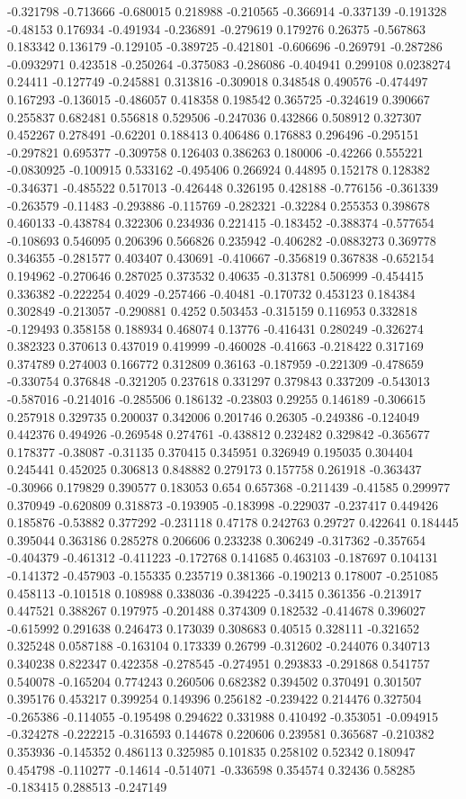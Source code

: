 -0.321798 -0.713666 -0.680015 0.218988 -0.210565 -0.366914 -0.337139 -0.191328 -0.48153 0.176934 -0.491934 -0.236891 -0.279619 0.179276 0.26375 -0.567863 0.183342 0.136179 -0.129105 -0.389725 -0.421801 -0.606696 -0.269791 -0.287286 -0.0932971 0.423518 -0.250264 -0.375083 -0.286086 -0.404941 0.299108 0.0238274 0.24411 -0.127749 -0.245881 0.313816 -0.309018 0.348548 0.490576 -0.474497 0.167293 -0.136015 -0.486057 0.418358 0.198542 0.365725 -0.324619 0.390667 0.255837 0.682481 0.556818 0.529506 -0.247036 0.432866 0.508912 0.327307 0.452267 0.278491 -0.62201 0.188413 0.406486 0.176883 0.296496 -0.295151 -0.297821 0.695377 -0.309758 0.126403 0.386263 0.180006 -0.42266 0.555221 -0.0830925 -0.100915 0.533162 -0.495406 0.266924 0.44895 0.152178 0.128382 -0.346371 -0.485522 0.517013 -0.426448 0.326195 0.428188 -0.776156 -0.361339 -0.263579 -0.11483 -0.293886 -0.115769 -0.282321 -0.32284 0.255353 0.398678 0.460133 -0.438784 0.322306 0.234936 0.221415 -0.183452 -0.388374 -0.577654 -0.108693 0.546095 0.206396 0.566826 0.235942 -0.406282 -0.0883273 0.369778 0.346355 -0.281577 0.403407 0.430691 -0.410667 -0.356819 0.367838 -0.652154 0.194962 -0.270646 0.287025 0.373532 0.40635 -0.313781 0.506999 -0.454415 0.336382 -0.222254 0.4029 -0.257466 -0.40481 -0.170732 0.453123 0.184384 0.302849 -0.213057 -0.290881 0.4252 0.503453 -0.315159 0.116953 0.332818 -0.129493 0.358158 0.188934 0.468074 0.13776 -0.416431 0.280249 -0.326274 0.382323 0.370613 0.437019 0.419999 -0.460028 -0.41663 -0.218422 0.317169 0.374789 0.274003 0.166772 0.312809 0.36163 -0.187959 -0.221309 -0.478659 -0.330754 0.376848 -0.321205 0.237618 0.331297 0.379843 0.337209 -0.543013 -0.587016 -0.214016 -0.285506 0.186132 -0.23803 0.29255 0.146189 -0.306615 0.257918 0.329735 0.200037 0.342006 0.201746 0.26305 -0.249386 -0.124049 0.442376 0.494926 -0.269548 0.274761 -0.438812 0.232482 0.329842 -0.365677 0.178377 -0.38087 -0.31135 0.370415 0.345951 0.326949 0.195035 0.304404 0.245441 0.452025 0.306813 0.848882 0.279173 0.157758 0.261918 -0.363437 -0.30966 0.179829 0.390577 0.183053 0.654 0.657368 -0.211439 -0.41585 0.299977 0.370949 -0.620809 0.318873 -0.193905 -0.183998 -0.229037 -0.237417 0.449426 0.185876 -0.53882 0.377292 -0.231118 0.47178 0.242763 0.29727 0.422641 0.184445 0.395044 0.363186 0.285278 0.206606 0.233238 0.306249 -0.317362 -0.357654 -0.404379 -0.461312 -0.411223 -0.172768 0.141685 0.463103 -0.187697 0.104131 -0.141372 -0.457903 -0.155335 0.235719 0.381366 -0.190213 0.178007 -0.251085 0.458113 -0.101518 0.108988 0.338036 -0.394225 -0.3415 0.361356 -0.213917 0.447521 0.388267 0.197975 -0.201488 0.374309 0.182532 -0.414678 0.396027 -0.615992 0.291638 0.246473 0.173039 0.308683 0.40515 0.328111 -0.321652 0.325248 0.0587188 -0.163104 0.173339 0.26799 -0.312602 -0.244076 0.340713 0.340238 0.822347 0.422358 -0.278545 -0.274951 0.293833 -0.291868 0.541757 0.540078 -0.165204 0.774243 0.260506 0.682382 0.394502 0.370491 0.301507 0.395176 0.453217 0.399254 0.149396 0.256182 -0.239422 0.214476 0.327504 -0.265386 -0.114055 -0.195498 0.294622 0.331988 0.410492 -0.353051 -0.094915 -0.324278 -0.222215 -0.316593 0.144678 0.220606 0.239581 0.365687 -0.210382 0.353936 -0.145352 0.486113 0.325985 0.101835 0.258102 0.52342 0.180947 0.454798 -0.110277 -0.14614 -0.514071 -0.336598 0.354574 0.32436 0.58285 -0.183415 0.288513 -0.247149 